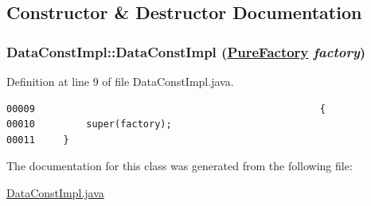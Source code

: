\subsection{Constructor \& Destructor Documentation}
\hypertarget{classDataConstImpl_b0}{
\subsubsection[DataConstImpl]{\setlength{\rightskip}{0pt plus 5cm}Data\-Const\-Impl::Data\-Const\-Impl (\hyperlink{classPureFactory}{Pure\-Factory} {\em factory})}}
\label{classDataConstImpl_b0}




Definition at line 9 of file Data\-Const\-Impl.java.\footnotesize\begin{verbatim}00009                                                  {
00010         super(factory);
00011     }
\end{verbatim}\normalsize 


The documentation for this class was generated from the following file:\begin{CompactItemize}
\item 
\hyperlink{DataConstImpl_8java-source}{Data\-Const\-Impl.java}\end{CompactItemize}
